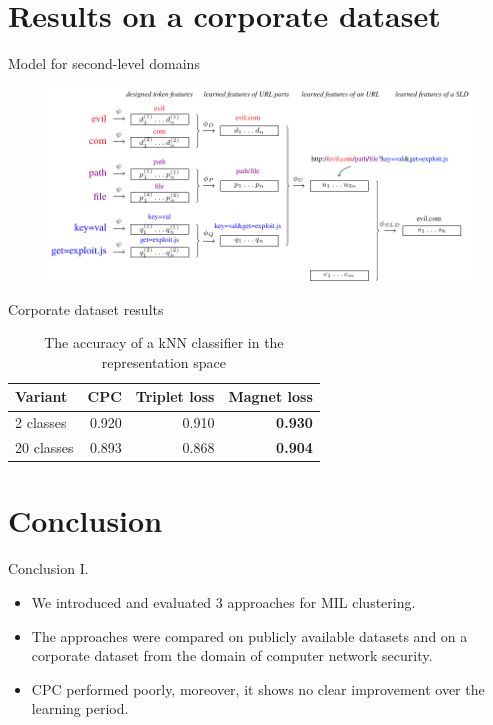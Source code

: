 \documentclass[10pt]{beamer}
\begin{document}
\section{Results on a corporate dataset}

\begin{frame}{Model for second-level domains}
	\begin{figure}
		\centering
		\includegraphics[width=\textwidth]{images/URL-model/URL-model.pdf}
	\end{figure}
\end{frame}

\begin{frame}{Corporate dataset results}
	\begin{table}
		\centering
		\begin{tabular}{lrrr}
			\toprule
			Variant    & CPC   & Triplet loss & Magnet loss \\
			\midrule
			2 classes  & 0.920 & 0.910        & \textbf{0.930} \\
			20 classes & 0.893 & 0.868        & \textbf{0.904} \\
			\bottomrule
		\end{tabular}
		\caption{The accuracy of a kNN classifier in the representation space}
	\end{table}
\end{frame}

\section{Conclusion}

\begin{frame}{Conclusion I.}
	\begin{itemize}
		\item We introduced and evaluated 3 approaches for MIL clustering.
		\item The approaches were compared on publicly available datasets and on a corporate dataset from the domain of computer network security.
		\item CPC performed poorly, moreover, it shows no clear improvement over the learning period.
	\end{itemize}
\end{frame}
\end{document}
